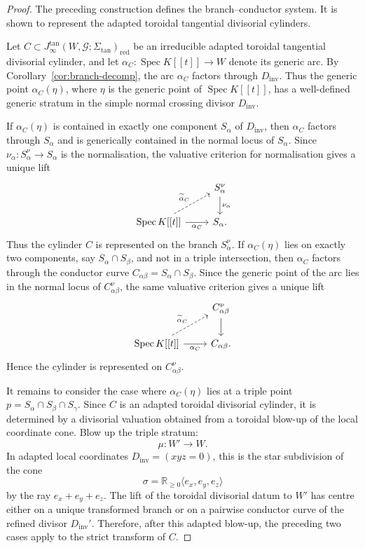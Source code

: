 \documentclass[11pt]{amsart}
\numberwithin{equation}{section}
\theoremstyle{plain}
\theoremstyle{definition}
\newcommand{\Spec}{\operatorname{Spec}}
\newcommand{\red}{\mathrm{red}}
\newcommand{\Dinv}{D_{\mathrm{inv}}}
\begin{document}
\begin{proof}
The preceding construction defines the branch--conductor system. It is shown to represent the adapted toroidal tangential divisorial cylinders.

Let \(C\subset J_\infty^{\tan}(W,\mathcal G;\Sigma_{\tan})_{\red}\) be an irreducible adapted toroidal tangential divisorial cylinder, and let \(\alpha_C:\Spec K[[t]]\to W\) denote its generic arc. By Corollary~\ref{cor:branch-decomp}, the arc \(\alpha_C\) factors through \(\Dinv\). Thus the generic point \(\alpha_C(\eta)\), where \(\eta\) is the generic point of \(\Spec K[[t]]\), has a well-defined generic stratum in the simple normal crossing divisor \(\Dinv\).

If \(\alpha_C(\eta)\) is contained in exactly one component \(S_\alpha\) of \(\Dinv\), then \(\alpha_C\) factors through \(S_\alpha\) and is generically contained in the normal locus of \(S_\alpha\). Since \(\nu_\alpha:S_\alpha^\nu\to S_\alpha\) is the normalisation, the valuative criterion for normalisation gives a unique lift
\[
\begin{tikzcd}
& S_\alpha^\nu \arrow[d,"\nu_\alpha"]\\
\Spec K[[t]] \arrow[r,"\alpha_C"'] \arrow[ur,dashed,"\widetilde\alpha_C"]&
S_\alpha.
\end{tikzcd}
\]
Thus the cylinder \(C\) is represented on the branch \(S_\alpha^\nu\).
If \(\alpha_C(\eta)\) lies on exactly two components, say
\(S_\alpha\cap S_\beta\), and not in a triple intersection, then
\(\alpha_C\) factors through the conductor curve
\(C_{\alpha\beta}=S_\alpha\cap S_\beta\). Since the generic point of the arc lies in the normal locus of \(C_{\alpha\beta}^\nu\), the same valuative criterion gives a unique lift
\[
\begin{tikzcd}
& C_{\alpha\beta}^\nu \arrow[d]\\
\Spec K[[t]] \arrow[r,"\alpha_C"'] \arrow[ur,dashed,"\widetilde\alpha_C"]&
C_{\alpha\beta}.
\end{tikzcd}
\]
Hence the cylinder is represented on \(C_{\alpha\beta}^\nu\).

It remains to consider the case where \(\alpha_C(\eta)\) lies at a triple point
\(p=S_\alpha\cap S_\beta\cap S_\gamma\). Since \(C\) is an adapted toroidal divisorial cylinder, it is determined by a divisorial valuation obtained from a toroidal blow-up of the local coordinate cone. Blow up the triple stratum:
\[
\mu:W'\longrightarrow W.
\]
In adapted local coordinates \(\Dinv=(xyz=0)\), this is the star subdivision of the cone
\[
\sigma=\mathbb R_{\geq 0}\langle e_x,e_y,e_z\rangle
\]
by the ray \(e_x+e_y+e_z\). The lift of the toroidal divisorial datum to \(W'\) has centre either on a unique transformed branch or on a pairwise conductor curve of the refined divisor \(\Dinv'\). Therefore, after this adapted blow-up, the preceding two cases apply to the strict transform of \(C\).


\end{proof}
\end{document}
